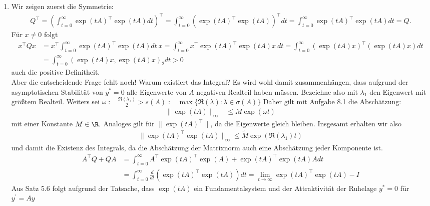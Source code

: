 \begin{solution}
\begin{enumerate}[label = \textbf{\alph*)}]
  \item Wir zeigen zuerst die Symmetrie:
  \begin{align*}
    Q^{\top} = \left(\int_{t = 0}^{\infty} \exp(tA)^{\top}\exp(tA) dt\right)^{\top}
    = \int_{t = 0}^{\infty} \left(\exp(tA)^{\top}\exp(tA)\right)^{\top} dt
    = \int_{t = 0}^{\infty} \exp(tA)^{\top}\exp(tA) dt = Q.
  \end{align*}
  Für $x \neq 0$ folgt
  \begin{align*}
    x^{\top}Qx &= x^{\top}\int_{t = 0}^{\infty} \exp(tA)^{\top}\exp(tA) dt~x
    = \int_{t = 0}^{\infty} x^{\top}\exp(tA)^{\top}\exp(tA) x~ dt
    = \int_{t = 0}^{\infty} (\exp(tA)x)^{\top}(\exp(tA)x) dt \\
    &= \int_{t = 0}^{\infty} (\exp(tA)x,\exp(tA)x)_2 dt > 0
  \end{align*}
  auch die positive Definitheit. \\
  Aber die entscheidende Frage fehlt noch! Warum existiert das Integral?
  Es wird wohl damit zusammenhängen, dass aufgrund der asymptotischen Stabilität
  von $y^* = 0$ alle Eigenwerte von $A$ negativen Realteil haben müssen.
  Bezeichne also mit $\lambda_1$ den Eigenwert mit größtem Realteil.
  Weiters sei $\omega := \frac{\Re(\lambda_1)}{2} > s(A) := \max \{\Re(\lambda): \lambda \in \sigma(A)\}$
  Daher gilt mit Aufgabe 8.1 die Abschätzung:
  \begin{align*}
    \|\exp(tA)\|_{\infty} &\leq  M\exp(\omega t)
  \end{align*}
  mit einer Konstante $M \in \R.$
  Analoges gilt für $\|\exp(tA)^{\top}\|$, da die Eigenwerte gleich bleiben. Insgesamt erhalten wir also
  \begin{align*}
    \|\exp(tA)^{\top}\exp(tA)\|_{\infty} \leq \widetilde{M}\exp(\Re(\lambda_1) t)
  \end{align*}
  und damit die Existenz des Integrals, da die Abschätzung der Matrixnorm auch
  eine Abschätzung jeder Komponente ist.
  \begin{align*}
    A^{\top}Q + QA &= \int_{t = 0}^{\infty} A^{\top}\exp(tA)^{\top}\exp(A) + \exp(tA)^{\top}\exp(tA)Adt \\
    &= \int_{t = 0}^{\infty} \frac{d}{dt}(\exp(tA)^{\top}\exp(tA)) dt
    = \lim_{t \to \infty} \exp(tA)^{\top}\exp(tA) - I
  \end{align*}
  Aus Satz 5.6 folgt aufgrund der Tatsache, dass $\exp(tA)$ ein Fundamentalsystem
  und der Attraktivität der Ruhelage $y^* = 0$ für $y^{\prime} = Ay$

\end{enumerate}
\end{solution}
